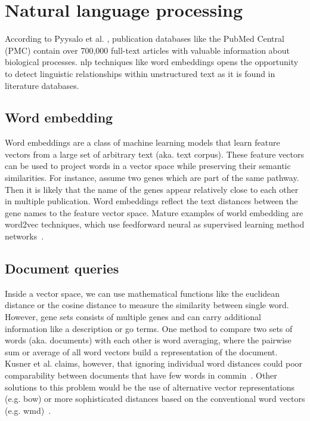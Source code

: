 \documentclass{thesisclass}
\begin{document}
\section{Natural language processing}


According to Pyysalo et al. \cite{Pyysalo:2013b}, publication databases like the PubMed Central (PMC) contain over 700,000 full-text articles with valuable information about biological processes. \acrfull{nlp} techniques like word embeddings opens the opportunity to detect linguistic relationships within unstructured text as it is found in literature databases.

\subsection{Word embedding}

Word embeddings are a class of machine learning models that learn feature vectors from a large set of arbitrary text (aka. text corpus). These feature vectors can be used to project words in a vector space while preserving their semantic similarities. For instance, assume two genes which are part of the same pathway. Then it is likely that the name of the genes appear relatively close to each other in multiple publication. Word embeddings reflect the text distances between the gene names to the feature vector space. Mature examples of world embedding are word2vec techniques, which use feedforward neural as supervised learning method networks~\cite{journals/corr/abs-1301-3781}. 


\subsection{Document queries}

Inside a vector space, we can use mathematical functions like the euclidean distance or the cosine distance to measure the similarity between single word. However, gene sets consists of multiple genes and can carry additional information like a description or \acrshort{go} terms. One method to compare two sets of words (aka. documents) with each other is word averaging, where the pairwise sum or average of all word vectors build a representation of the document. Kusner et al. claims, however, that ignoring individual word distances could poor comparability between documents that have few words in commin~\cite{Kusner:2015:WED:3045118.3045221}. Other solutions to this problem would be the use of alternative vector representations (e.g. \acrfull{bow}) or more sophisticated distances based on the conventional word vectors (e.g. \acrfull{wmd})~\cite{Kusner:2015:WED:3045118.3045221}. 
\end{document}
